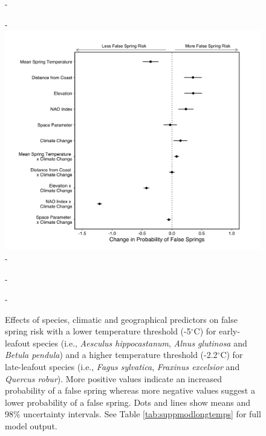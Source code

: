 \documentclass{article}\usepackage[]{graphicx}\usepackage[]{color}
\begin{document}
  {\begin{figure} [H]
  -\begin{center}
  -\includegraphics[width=12cm]{..//analyses/figures/model_output_98_longtemps.png}
  -\caption{Effects of species, climatic and geographical predictors on false spring risk with a lower temperature threshold (-5$^{\circ}$C) for early-leafout species (i.e., \textit{Aesculus hippocastanum}, \textit{Alnus glutinosa} and \textit{Betula pendula}) and a higher temperature threshold (-2.2$^{\circ}$C) for late-leafout species (i.e., \textit{Fagus sylvatica}, \textit{Fraxinus excelsior} and \textit{Quercus robur}). More positive values indicate an increased probability of a false spring whereas more negative values suggest a lower probability of a false spring. Dots and lines show means and 98\% uncertainty intervals. See Table \ref{tab:suppmodlongtemps} for full model output. }\label{fig:longtemps}
  -\end{center}
  -\end{figure}}
  
\end{document}
